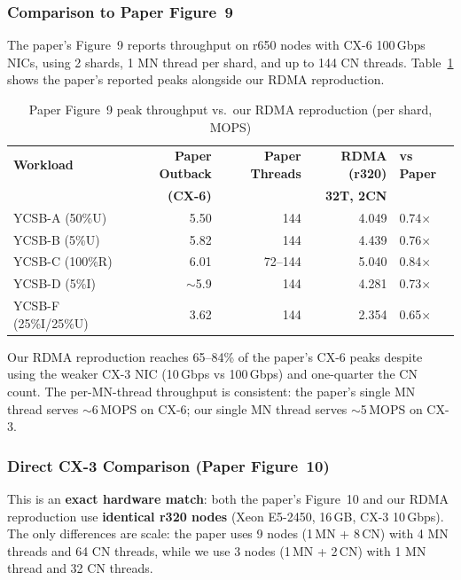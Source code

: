 \documentclass[conference]{IEEEtran}
\begin{document}
\subsubsection{Comparison to Paper Figure~9}

The paper's Figure~9 reports throughput on r650 nodes with CX-6 100\,Gbps NICs, using 2 shards, 1 MN thread per shard, and up to 144 CN threads. Table~\ref{tab:paper-fig9} shows the paper's reported peaks alongside our RDMA reproduction.

\begin{table}[H]
\centering
\caption{Paper Figure~9 peak throughput vs.\ our RDMA reproduction (per shard, MOPS)}
\label{tab:paper-fig9}
\small
\begin{tabular}{@{}lrrrl@{}}
\toprule
\textbf{Workload} & \textbf{Paper Outback} & \textbf{Paper Threads} & \textbf{RDMA (r320)} & \textbf{vs Paper} \\
 & \textbf{(CX-6)} & & \textbf{32T, 2CN} & \\
\midrule
YCSB-A (50\%U) & 5.50 & 144 & 4.049 & 0.74$\times$ \\
YCSB-B (5\%U)  & 5.82 & 144 & 4.439 & 0.76$\times$ \\
YCSB-C (100\%R) & 6.01 & 72--144 & 5.040 & 0.84$\times$ \\
YCSB-D (5\%I)   & $\sim$5.9 & 144 & 4.281 & 0.73$\times$ \\
YCSB-F (25\%I/25\%U) & 3.62 & 144 & 2.354 & 0.65$\times$ \\
\bottomrule
\end{tabular}
\end{table}

Our RDMA reproduction reaches 65--84\% of the paper's CX-6 peaks despite using the weaker CX-3 NIC (10\,Gbps vs 100\,Gbps) and one-quarter the CN count. The per-MN-thread throughput is consistent: the paper's single MN thread serves $\sim$6\,MOPS on CX-6; our single MN thread serves $\sim$5\,MOPS on CX-3.

\subsubsection{Direct CX-3 Comparison (Paper Figure~10)}

This is an \textbf{exact hardware match}: both the paper's Figure~10 and our RDMA reproduction use \textbf{identical r320 nodes} (Xeon E5-2450, 16\,GB, CX-3 10\,Gbps). The only differences are scale: the paper uses 9 nodes (1\,MN + 8\,CN) with 4 MN threads and 64 CN threads, while we use 3 nodes (1\,MN + 2\,CN) with 1 MN thread and 32 CN threads.
\end{document}
